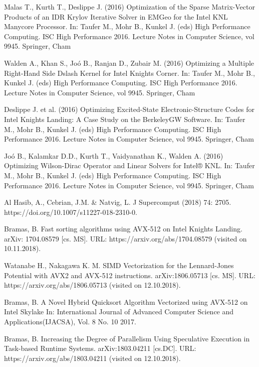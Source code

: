 \documentclass[
11pt,%
tightenlines,%
twoside,%
onecolumn,%
nofloats,%
nobibnotes,%
nofootinbib,%
superscriptaddress,%
noshowpacs,%
centertags]%
{revtex4}
\begin{document}
\begin{thebibliography}{99}
Malas T., Kurth T., Deslippe J. (2016) Optimization of the Sparse Matrix-Vector Products of an IDR Krylov Iterative Solver in EMGeo for the Intel KNL Manycore Processor. In: Taufer M., Mohr B., Kunkel J. (eds) High Performance Computing. ISC High Performance 2016. Lecture Notes in Computer Science, vol 9945. Springer, Cham

Walden A., Khan S., Joó B., Ranjan D., Zubair M. (2016) Optimizing a Multiple Right-Hand Side Dslash Kernel for Intel Knights Corner. In: Taufer M., Mohr B., Kunkel J. (eds) High Performance Computing. ISC High Performance 2016. Lecture Notes in Computer Science, vol 9945. Springer, Cham

Deslippe J. et al. (2016) Optimizing Excited-State Electronic-Structure Codes for Intel Knights Landing: A Case Study on the BerkeleyGW Software. In: Taufer M., Mohr B., Kunkel J. (eds) High Performance Computing. ISC High Performance 2016. Lecture Notes in Computer Science, vol 9945. Springer, Cham

Joó B., Kalamkar D.D., Kurth T., Vaidyanathan K., Walden A. (2016) Optimizing Wilson-Dirac Operator and Linear Solvers for Intel® KNL. In: Taufer M., Mohr B., Kunkel J. (eds) High Performance Computing. ISC High Performance 2016. Lecture Notes in Computer Science, vol 9945. Springer, Cham

Al Hasib, A., Cebrian, J.M. \& Natvig, L. J Supercomput (2018) 74: 2705. https://doi.org/10.1007/s11227-018-2310-0.

Bramas, B. Fast sorting algorithms using AVX-512 on Intel Knights Landing. arXiv: 1704.08579 [cs. MS]. URL: https://arxiv.org/abs/1704.08579 (visited on 10.11.2018).

Watanabe H., Nakagawa K. M. SIMD Vectorization for the Lennard-Jones Potential with AVX2 and AVX-512 instructions. arXiv:1806.05713 [cs. MS]. URL: https://arxiv.org/abs/1806.05713 (visited on 12.10.2018).

Bramas, B. A Novel Hybrid Quicksort Algorithm Vectorized using AVX-512 on Intel Skylake In: International Journal of Advanced Computer Science and Applications(IJACSA), Vol. 8 No. 10 2017.

Bramas, B. Increasing the Degree of Parallelism Using Speculative Execution in Task-based Runtime Systems. arXiv:1803.04211 [cs.DC]. URL: https://arxiv.org/abs/1803.04211 (visited on 12.10.2018).


\end{thebibliography}
\end{document}
